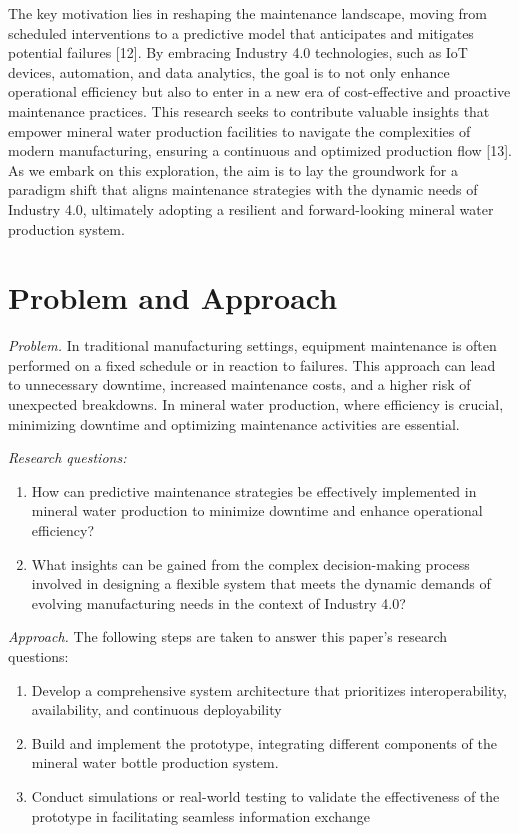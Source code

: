 \documentclass[conference]{IEEEtran}
\begin{document}
The key motivation lies in reshaping the maintenance landscape, moving from scheduled interventions to a predictive model that anticipates and mitigates potential failures [12]. By embracing Industry 4.0 technologies, such as IoT devices, automation, and data analytics, the goal is to not only enhance operational efficiency but also to enter in a new era of cost-effective and proactive maintenance practices. This research seeks to contribute valuable insights that empower mineral water production facilities to navigate the complexities of modern manufacturing, ensuring a continuous and optimized production flow [13]. As we embark on this exploration, the aim is to lay the groundwork for a paradigm shift that aligns maintenance strategies with the dynamic needs of Industry 4.0, ultimately adopting a resilient and forward-looking mineral water production system.
 
\section{Problem and Approach}

\label{sec:problem}
\emph{Problem.}
In traditional manufacturing settings, equipment maintenance is often performed on a fixed schedule or in reaction to failures. This approach can lead to unnecessary downtime, increased maintenance costs, and a higher risk of unexpected breakdowns. In mineral water production, where efficiency is crucial, minimizing downtime and optimizing maintenance activities are essential.  

\emph{Research questions:}
\begin{enumerate}
    \item How can predictive maintenance strategies be effectively implemented in mineral water production to minimize downtime and enhance operational efficiency?
    \item What insights can be gained from the complex decision-making process involved in designing a flexible system that meets the dynamic demands of evolving manufacturing needs in the context of Industry 4.0?
\end{enumerate}


\emph{Approach.}
The following steps are taken to answer this paper's research questions: 
\begin{enumerate}
    \item Develop a comprehensive system architecture that prioritizes interoperability, availability, and continuous deployability
    \item Build and implement the prototype, integrating different components of the mineral water bottle production system.
    \item Conduct simulations or real-world testing to validate the effectiveness of the prototype in facilitating seamless information exchange
\end{enumerate}
\end{document}

